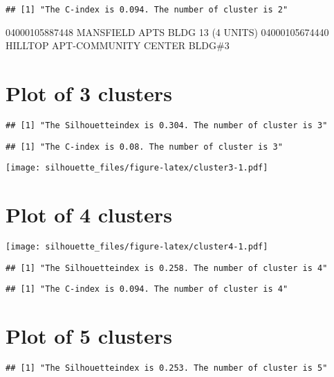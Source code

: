 \documentclass[
]{article}
\begin{document}
\begin{verbatim}
## [1] "The C-index is 0.094. The number of cluster is 2"
\end{verbatim}

04000105887448 MANSFIELD APTS BLDG 13 (4 UNITS) 04000105674440 HILLTOP
APT-COMMUNITY CENTER BLDG\#3

\newpage

\hypertarget{plot-of-3-clusters}{%
\section{Plot of 3 clusters}\label{plot-of-3-clusters}}

\begin{verbatim}
## [1] "The Silhouetteindex is 0.304. The number of cluster is 3"
\end{verbatim}

\begin{verbatim}
## [1] "The C-index is 0.08. The number of cluster is 3"
\end{verbatim}

\texttt{[image: silhouette\_files/figure-latex/cluster3-1.pdf]}

\newpage

\hypertarget{plot-of-4-clusters}{%
\section{Plot of 4 clusters}\label{plot-of-4-clusters}}

\texttt{[image: silhouette\_files/figure-latex/cluster4-1.pdf]}

\begin{verbatim}
## [1] "The Silhouetteindex is 0.258. The number of cluster is 4"
\end{verbatim}

\begin{verbatim}
## [1] "The C-index is 0.094. The number of cluster is 4"
\end{verbatim}

\newpage

\hypertarget{plot-of-5-clusters}{%
\section{Plot of 5 clusters}\label{plot-of-5-clusters}}

\begin{verbatim}
## [1] "The Silhouetteindex is 0.253. The number of cluster is 5"
\end{verbatim}
\end{document}
